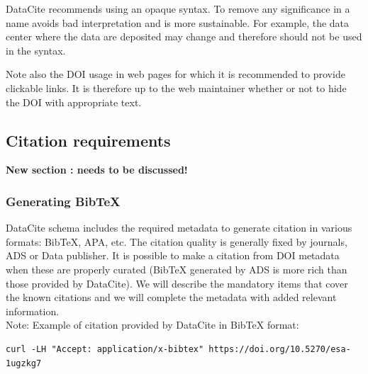 \documentclass[11pt,a4paper]{ivoa}
\begin{document}
DataCite recommends using an opaque syntax. To remove any significance
in a name avoids bad interpretation and is more sustainable. For example,
the data center where the data are deposited may change and therefore
should not be used in the syntax.

Note also the DOI usage in web pages for which it is recommended to provide clickable links. It is therefore up to the web maintainer whether or not to hide the DOI with appropriate text.

\subsection{Citation requirements}
\label{sec:citation}
\textbf{\color{red} New section : needs to be discussed!}


\subsubsection{Generating BibTeX}
DataCite schema includes the required metadata to generate citation in various formats: BibTeX, APA, etc. The citation quality is generally fixed by journals, ADS or Data publisher. It is possible to make a citation from DOI metadata when these are properly curated (BibTeX generated by ADS is more rich than those provided by DataCite). 
We will describe the mandatory items that cover the known citations and we will complete the metadata with added relevant information.\\


Note: Example of citation provided by DataCite in BibTeX format:

\begin{verbatim}
curl -LH "Accept: application/x-bibtex" https://doi.org/10.5270/esa-1ugzkg7
\end{verbatim}
\end{document}
